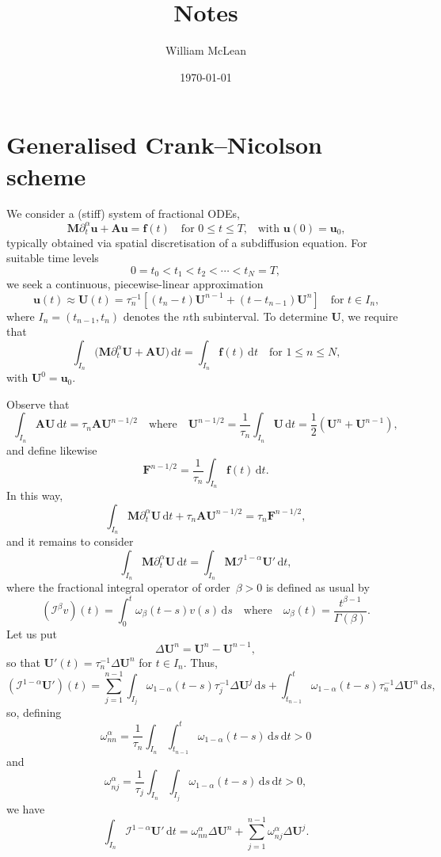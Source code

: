 \documentclass[a4paper,12pt]{article}
\title{Notes}
\date{\today}
\author{William McLean}
\newcommand{\bs}[1]{\boldsymbol{#1}}
\newcommand{\ud}{\mathrm{d}}
\begin{document}
\maketitle
\section{Generalised Crank--Nicolson scheme}
We consider a (stiff) system of fractional ODEs,
\[
\bs{M}\partial_t^\alpha\bs{u}+\bs{A}\bs{u}=\bs{f}(t)
    \quad\text{for $0\le t\le T$,}\quad\text{with $\bs{u}(0)=\bs{u}_0$,}
\]
typically obtained via spatial discretisation of a subdiffusion equation.
For suitable time levels
\[
0=t_0<t_1<t_2<\cdots<t_N=T,
\]
we seek a continuous, piecewise-linear approximation
\[
\bs{u}(t)\approx\bs{U}(t)=\tau_n^{-1}[(t_n-t)\bs{U}^{n-1}+(t-t_{n-1})\bs{U}^n]
\quad\text{for $t\in I_n$,}
\]
where $I_n=(t_{n-1},t_n)$ denotes the $n$th subinterval.  To determine $\bs{U}$,
we require that
\begin{equation}\label{eq: gen CN}
\int_{I_n}\bigl(\bs{M}\partial_t^\alpha\bs{U}+\bs{A}\bs{U}\bigr)\,\ud t
    =\int_{I_n}\bs{f}(t)\,\ud t\quad\text{for $1\le n\le N$,}
\end{equation}
with $\bs{U}^0=\bs{u}_0$.

Observe that
\[
\int_{I_n}\bs{A}\bs{U}\,\ud t=\tau_n\bs{A}\bs{U}^{n-1/2}\quad\text{where}\quad
\bs{U}^{n-1/2}=\frac{1}{\tau_n}\int_{I_n}\bs{U}\,\ud t
    =\frac{1}{2}(\bs{U}^n+\bs{U}^{n-1}),
\]
and define likewise
\[
\bs{F}^{n-1/2}=\frac{1}{\tau_n}\int_{I_n}\bs{f}(t)\,\ud t.
\]
In this way,
\[
\int_{I_n}\bs{M}\partial_t^\alpha\bs{U}\,\ud t+\tau_n\bs{A}\bs{U}^{n-1/2}
    =\tau_n\bs{F}^{n-1/2},
\]
and it remains to consider
\[
\int_{I_n}\bs{M}\partial_t^\alpha\bs{U}\,\ud t
    =\int_{I_n}\bs{M}\mathcal{I}^{1-\alpha}\bs{U}'\,\ud t,
\]
where the fractional integral operator of order~$\beta>0$ is defined as usual by
\[
(\mathcal{I}^\beta v)(t)=\int_0^t\omega_\beta(t-s)v(s)\,\ud s
\quad\text{where}\quad\omega_\beta(t)=\frac{t^{\beta-1}}{\Gamma(\beta)}.
\]
Let us put
\[
\Delta\bs{U}^n=\bs{U}^n-\bs{U}^{n-1},
\]
so that $\bs{U}'(t)=\tau_n^{-1}\Delta\bs{U}^n$ for $t\in I_n$. Thus,
\[
(\mathcal{I}^{1-\alpha}\bs{U}')(t)=\sum_{j=1}^{n-1}\int_{I_j}
    \omega_{1-\alpha}(t-s)\tau_j^{-1}\Delta\bs{U}^j\,\ud s
    +\int_{t_{n-1}}^t\omega_{1-\alpha}(t-s)\tau_n^{-1}\Delta\bs{U}^n\,\ud s,
\]
so, defining
\[
\omega^\alpha_{nn}=\frac{1}{\tau_n}\int_{I_n}\int_{t_{n-1}}^t
    \omega_{1-\alpha}(t-s)\,\ud s\,\ud t>0
\]
and
\[
\omega^\alpha_{nj}=\frac{1}{\tau_j}\int_{I_n}\int_{I_j}
    \omega_{1-\alpha}(t-s)\,\ud s\,\ud t>0,
\]
we have
\[
\int_{I_n}\mathcal{I}^{1-\alpha}\bs{U}'\,\ud t
    =\omega^\alpha_{nn}\Delta\bs{U}^n
    +\sum_{j=1}^{n-1}\omega^\alpha_{nj}\Delta\bs{U}^j.
\]
\end{document}
